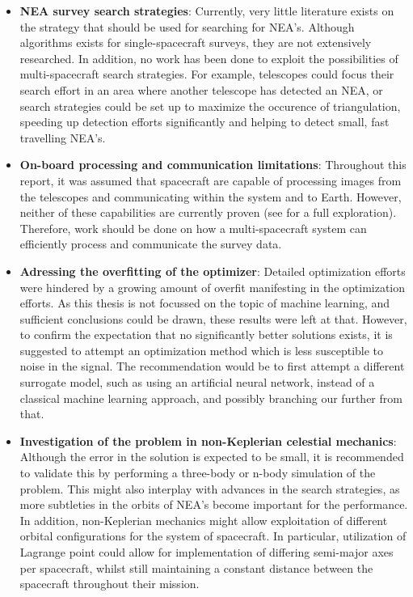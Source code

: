 \begin{itemize}
 \item \textbf{NEA survey search strategies}: Currently, very little literature exists on the strategy that should be used for searching for NEA's. Although algorithms exists for single-spacecraft surveys, they are not extensively researched. In addition, no work has been done to exploit the possibilities of multi-spacecraft search strategies. For example, telescopes could focus their search effort in an area where another telescope has detected an NEA, or search strategies could be set up to maximize the occurence of triangulation, speeding up detection efforts significantly and helping to detect small, fast travelling NEA's.
 \item \textbf{On-board processing and communication limitations}: Throughout this report, it was assumed that spacecraft are capable of processing images from the telescopes and communicating within the system and to Earth. However, neither of these capabilities are currently proven (see \cite{LiteratureReview} for a full exploration). Therefore, work should be done on how a multi-spacecraft system can efficiently process and communicate the survey data.
 \item \textbf{Adressing the overfitting of the optimizer}: Detailed optimization efforts were hindered by a growing amount of overfit manifesting in the optimization efforts. As this thesis is not focussed on the topic of machine learning, and sufficient conclusions could be drawn, these results were left at that. However, to confirm the expectation that no significantly better solutions exists, it is suggested to attempt an optimization method which is less susceptible to noise in the signal. The recommendation would be to first attempt a different surrogate model, such as using an artificial neural network, instead of a classical machine learning approach, and possibly branching our further from that.
 \item \textbf{Investigation of the problem in non-Keplerian celestial mechanics}: Although the error in the solution is expected to be small, it is recommended to validate this by performing a three-body or n-body simulation of the problem. This might also interplay with advances in the search strategies, as more subtleties in the orbits of NEA's become important for the performance. In addition, non-Keplerian mechanics might allow exploitation of different orbital configurations for the system of spacecraft. In particular, utilization of Lagrange point could allow for implementation of differing semi-major axes per spacecraft, whilst still maintaining a constant distance between the spacecraft throughout their mission.
\end{itemize}
